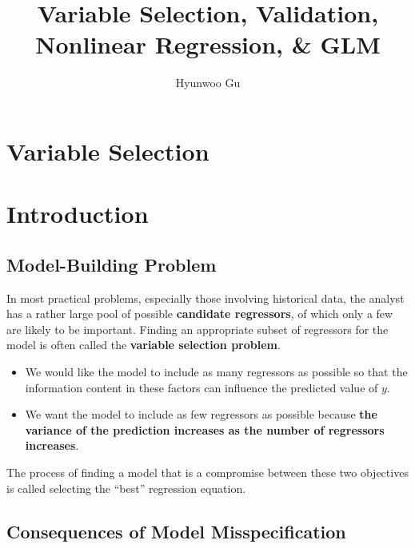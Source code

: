\documentclass[12pt]{article}
\begin{document}
\title{\textbf{Variable Selection, Validation, \\  Nonlinear Regression, \& GLM}}
\author{Hyunwoo Gu}
\date{}

\maketitle


\section*{Variable Selection}
\section{Introduction}

\subsection{Model-Building Problem}

In most practical problems, especially those involving historical data, the analyst has a rather large pool of possible \textbf{candidate regressors}, of which only a few are likely to be important. Finding an appropriate subset of regressors for the model is often called the \textbf{variable selection problem}.

\begin{itemize}
	\item We would like the model to include as many regressors as possible so that the information content in these factors can influence the predicted value of $y$.
	\item We want the model to include as few regressors as possible because \textbf{the variance of the prediction increases as the number of regressors increases}.
\end{itemize}

The process of finding a model that is a compromise between these two objectives is called selecting the “best” regression equation.



\subsection{Consequences of Model Misspecification}
\end{document}
